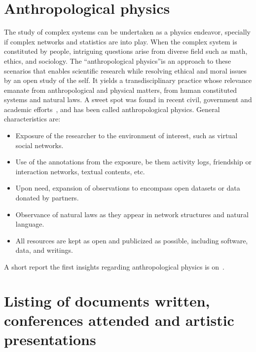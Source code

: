 \begin{apendicesenv}
\section{Anthropological physics}
The study of complex systems can be undertaken as a physics endeavor,
specially if complex networks and statistics are into play. When the complex
system is constituted by people, intriguing questions arise from diverse field such as math, ethics, and sociology. The “anthropological physics”is an approach to these scenarios that enables scientific research while resolving ethical and moral issues by an open study of the self.
	It yields a transdisciplinary practice whose relevance emanate from anthropological
and physical matters, from human constituted systems and natural laws.
A sweet spot was found in recent civil, government and academic efforts~\cite{opa,ensaio}, and has been called anthropological physics. General characteristics are:
\begin{itemize}
	\item Exposure of the researcher to the environment of interest, such as virtual social networks.
	\item Use of the annotations from the exposure, be them activity logs, friendship or interaction networks, textual contents, etc.
	\item Upon need, expansion of observations to encompass open datasets or data donated by partners.
	\item Observance of natural laws as they appear in network structures and natural language.
	\item All resources are kept as open and publicized as possible, including software, data, and writings.
\end{itemize}                                                                                                                                     
A short report the first insights regarding anthropological physics is on~\cite{anPhy}.
 

\section{Listing of documents written, conferences attended and artistic presentations}

\end{apendicesenv}
